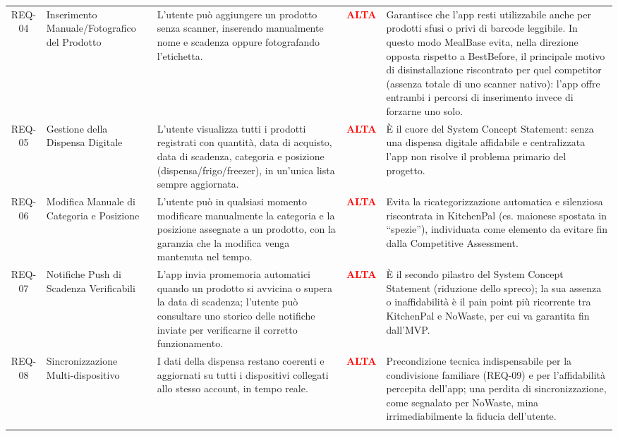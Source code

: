 \documentclass[11pt,a4paper]{article}
\begin{document}
{\begin{longtable}{
  c 
  >{\raggedright\arraybackslash}p{} 
  >{\raggedright\arraybackslash}p{} 
  c 
  >{\raggedright\arraybackslash}p{}
}
REQ-04 & Inserimento Manuale/Fotografico del Prodotto & L'utente può aggiungere un prodotto senza scanner, inserendo manualmente nome e scadenza oppure fotografando l'etichetta. & \textcolor{red}{\textbf{ALTA}} & Garantisce che l'app resti utilizzabile anche per prodotti sfusi o privi di barcode leggibile. In questo modo MealBase evita, nella direzione opposta rispetto a BestBefore, il principale motivo di disinstallazione riscontrato per quel competitor (assenza totale di uno scanner nativo): l'app offre entrambi i percorsi di inserimento invece di forzarne uno solo. \\ \addlinespace[0.6em]

REQ-05 & Gestione della Dispensa Digitale & L'utente visualizza tutti i prodotti registrati con quantità, data di acquisto, data di scadenza, categoria e posizione (dispensa/frigo/freezer), in un'unica lista sempre aggiornata. & \textcolor{red}{\textbf{ALTA}} & È il cuore del System Concept Statement: senza una dispensa digitale affidabile e centralizzata l'app non risolve il problema primario del progetto. \\ \addlinespace[0.6em]

REQ-06 & Modifica Manuale di Categoria e Posizione & L'utente può in qualsiasi momento modificare manualmente la categoria e la posizione assegnate a un prodotto, con la garanzia che la modifica venga mantenuta nel tempo. & \textcolor{red}{\textbf{ALTA}} & Evita la ricategorizzazione automatica e silenziosa riscontrata in KitchenPal (es. maionese spostata in ``spezie''), individuata come elemento da evitare fin dalla Competitive Assessment. \\ \addlinespace[0.6em]

REQ-07 & Notifiche Push di Scadenza Verificabili & L'app invia promemoria automatici quando un prodotto si avvicina o supera la data di scadenza; l'utente può consultare uno storico delle notifiche inviate per verificarne il corretto funzionamento. & \textcolor{red}{\textbf{ALTA}} & È il secondo pilastro del System Concept Statement (riduzione dello spreco); la sua assenza o inaffidabilità è il pain point più ricorrente tra KitchenPal e NoWaste, per cui va garantita fin dall'MVP. \\ \addlinespace[0.6em]

REQ-08 & Sincronizzazione Multi-dispositivo & I dati della dispensa restano coerenti e aggiornati su tutti i dispositivi collegati allo stesso account, in tempo reale. & \textcolor{red}{\textbf{ALTA}} & Precondizione tecnica indispensabile per la condivisione familiare (REQ-09) e per l'affidabilità percepita dell'app; una perdita di sincronizzazione, come segnalato per NoWaste, mina irrimediabilmente la fiducia dell'utente. \\ \addlinespace[0.6em]


\end{longtable}}
\end{document}

